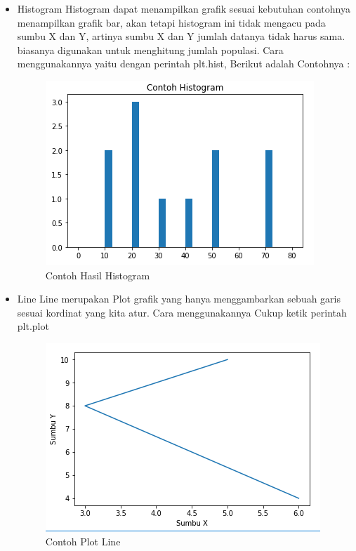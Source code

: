 \begin{itemize}	
	\item Histogram\newline
	Histogram dapat menampilkan grafik sesuai kebutuhan contohnya menampilkan grafik bar, akan tetapi histogram ini
	tidak mengacu pada sumbu X dan Y, artinya sumbu X dan Y jumlah datanya tidak harus sama. biasanya digunakan
	untuk menghitung jumlah populasi.\newline
	Cara menggunakannya yaitu dengan perintah plt.hist, Berikut adalah Contohnya :

	

\begin{figure}[h]
\centering
\includegraphics[scale=0.9]{figures/6/Teori/1174025/no3h.png}
\caption{Contoh Hasil Histogram}
\label{fig:contoh}
\end{figure}
\end{itemize}

\begin{itemize}
	\item Line\newline
	Line merupakan Plot grafik yang hanya menggambarkan sebuah garis sesuai kordinat yang kita atur.
	Cara menggunakannya Cukup ketik perintah plt.plot

	

\begin{figure}[h]
\centering
\includegraphics[scale=0.6]{figures/6/Teori/1174025/no2.png}
\caption{Contoh Plot Line}
\label{fig:contoh}
\end{figure}
\end{itemize}

